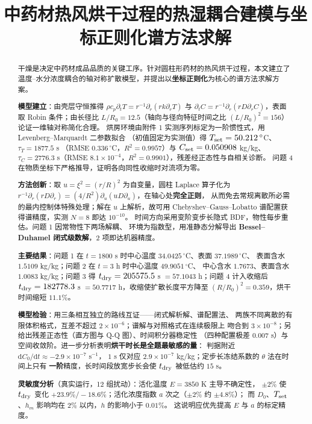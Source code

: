 \documentclass[withoutpreface,bwprint]{cumcmthesis}
\title{中药材热风烘干过程的热湿耦合建模与坐标正则化谱方法求解}
\begin{document}
\maketitle

\begin{abstract}
\noindent
干燥是决定中药材成品品质的关键工序。针对圆柱形药材的热风烘干过程，本文建立了
温度--水分浓度耦合的轴对称扩散模型，并提出以\textbf{坐标正则化}为核心的谱方法求解方案。

\textbf{模型建立}：由壳层守恒推得 $\rho c_p\partial_tT=r^{-1}\partial_r(rk\partial_rT)$ 与
$\partial_tC=r^{-1}\partial_r(rD\partial_rC)$，表面取 Robin 条件；由长径比
$L/R_0=12.5$（轴向与径向特征时间之比 $(L/R_0)^2=156$）论证一维轴对称简化合理。
烘房环境由附件 1 实测序列标定为一阶惯性式，用 Levenberg--Marquardt 二参数拟合
（初值固定为实测值）得 $T_{\rm set}=50.212\,^\circ$C、$\tau_T=1877.5$ s
（RMSE $0.336\,^\circ$C，$R^2=0.9957$）与 $C_{\rm set}=0.050908$ kg/kg、
$\tau_C=2776.3$ s（RMSE $8.1\times10^{-4}$，$R^2=0.9901$），残差经正态性与自相关诊断。
问题 4 在物质坐标下严格推导，证明各向同性收缩时对流项为零。

\textbf{方法创新}：取 $u=\xi^2=(r/R)^2$ 为自变量，圆柱 Laplace 算子化为
$r^{-1}\partial_r(rD\partial_r)=(4/R^2)\partial_u(uD\partial_u)$，在轴心处\textbf{完全正则}，
从而免去常规离散所必需的最内控制体特殊处理；解在 $u$ 上解析，故可用
Chebyshev--Gauss--Lobatto 谱配置获得谱精度，实测 $N=8$ 即达 $10^{-10}$。
时间方向采用变阶变步长隐式 BDF，物性每步重估。问题 1 因常物性下两场解耦、
环境为指数型，用准静态分解导出 \textbf{Bessel--Duhamel 闭式级数解}，2 项即达机器精度。

\textbf{主要结果}：问题 1 在 $t=1800$ s 时中心温度 $34.0425\,^\circ$C、表面 $37.1989\,^\circ$C、
表面含水 $1.5109$ kg/kg；问题 2 在 $t=3$ h 时中心温度 $49.9051\,^\circ$C、
中心含水 $1.7673$、表面含水 $1.0083$ kg/kg；问题 3 得
$t_{\rm dry}=205575.5$ s $=57.1043$ h；问题 4 计入收缩后
$t_{\rm dry}=182778.3$ s $=50.7717$ h，收缩使扩散长度平方降至
$(R/R_0)^2=0.359$，烘干时间缩短 $11.1\%$。

\textbf{模型检验}：用三条相互独立的路线互证——闭式解析解、谱配置法、
两族不同离散的有限体积格式，互差不超过 $2\times10^{-6}$；谱解与对照格式在连续极限上
吻合到 $3\times10^{-8}$；另给出残差正态性（直方图与 Q-Q 图）、时间积分器稳定性
（四种配置极差 $0.007$ s）与空间收敛阶。进一步分析表明\textbf{烘干时长是全题最敏感的量}：
判据附近 $\mathrm{d}C_0/\mathrm{d}t\approx-2.9\times10^{-7}$ s$^{-1}$，
$1$ s 仅对应 $2.9\times10^{-7}$ kg/kg；定步长冻结系数的 $\theta$ 法在时间上只有
\textbf{一阶}精度，长时间段放宽步长会使 $t_{\rm dry}$ 被低估约 $15$ s。

\textbf{灵敏度分析}（真实运行，12 组扰动）：活化温度 $E=3850$ K 主导不确定性，
$\pm2\%$ 使 $t_{\rm dry}$ 变化 $+23.9\%/-18.6\%$；活化浓度指数 $a$ 次之（$\pm2\%$ 约 $\pm4.8\%$）；
而 $D_0$、$T_{\rm set}$、$h_m$ 影响均在 $2\%$ 以内，$h$ 的影响小于 $0.01\%$。
这说明应优先提高 $E$ 与 $a$ 的标定精度。

\end{abstract}
\end{document}
